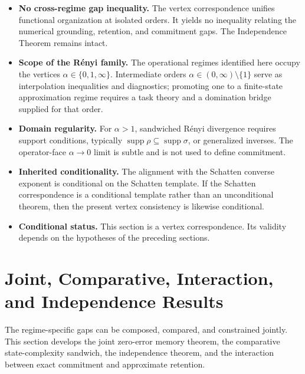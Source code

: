 \documentclass[12pt]{article}
\theoremstyle{definition}
\DeclareMathOperator{\supp}{supp}
\begin{document}
\begin{itemize}[leftmargin=1.6em]
\item \textbf{No cross-regime gap inequality.}
The vertex correspondence unifies functional organization at isolated orders.
It yields no inequality relating the numerical grounding, retention, and
commitment gaps.  The Independence Theorem remains intact.

\item \textbf{Scope of the R\'enyi family.}
The operational regimes identified here occupy the vertices
$\alpha\in\{0,1,\infty\}$.  Intermediate orders
$\alpha\in(0,\infty)\setminus\{1\}$ serve as interpolation inequalities and
diagnostics; promoting one to a finite-state approximation regime requires a
task theory and a domination bridge supplied for that order.

\item \textbf{Domain regularity.}
For $\alpha>1$, sandwiched R\'enyi divergence requires support conditions,
typically $\supp\rho\subseteq\supp\sigma$, or generalized inverses.  The
operator-face $\alpha\to0$ limit is subtle and is not used to define
commitment.

\item \textbf{Inherited conditionality.}
The alignment with the Schatten converse exponent is conditional on the
Schatten template.  If the Schatten correspondence is a conditional template
rather than an unconditional theorem, then the present vertex consistency is
likewise conditional.

\item \textbf{Conditional status.}
This section is a vertex correspondence.  Its validity depends on the
hypotheses of the preceding sections.
\end{itemize}

\section{Joint, Comparative, Interaction, and Independence Results}
\label{sec:joint}

The regime-specific gaps can be composed, compared, and constrained jointly.
This section develops the joint zero-error memory theorem, the comparative
state-complexity sandwich, the independence theorem, and the interaction
between exact commitment and approximate retention.
\end{document}
